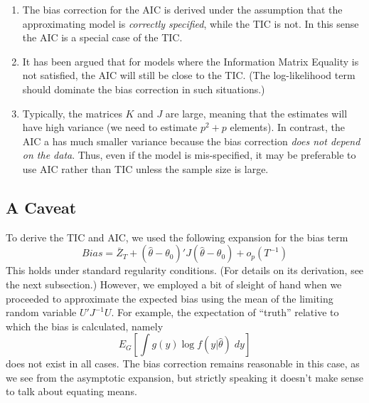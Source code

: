 \begin{enumerate}
\item The bias correction for the AIC is derived under the assumption that the approximating model is \emph{correctly specified}, while the TIC is not.
  In this sense the AIC is a special case of the TIC.
\item It has been argued that for models where the Information Matrix Equality is not satisfied, the AIC will still be close to the TIC.
  (The log-likelihood term should dominate the bias correction in such situations.)
\item Typically, the matrices $K$ and $J$ are large, meaning that the estimates will have high variance (we need to estimate $p^2 + p$ elements). In contrast, the AIC a has much smaller variance because the bias correction \emph{does not depend on the data}. Thus, even if the model is mis-specified, it may be preferable to use AIC rather than TIC unless the sample size is large.
\end{enumerate}

\subsection{A Caveat}
To derive the TIC and AIC, we used the following expansion for the bias term
$$Bias = \bar{Z}_T + (\widehat{\theta} - \theta_0)' J (\widehat{\theta} - \theta_0) + o_p(T^{-1})$$
This holds under standard regularity conditions.
(For details on its derivation, see the next subsection.) However, we employed a bit of sleight of hand when we proceeded to approximate the expected bias using the mean of the limiting random variable $U'J^{-1}U$. For example, the expectation of ``truth'' relative to which the bias is calculated, namely
$$E_G\left[\int g(y) \log f(y|\widehat{\theta})\; dy\right]$$
does not exist in all cases. The bias correction remains reasonable in this case, as we see from the asymptotic expansion, but strictly speaking it doesn't make sense to talk about equating means.

